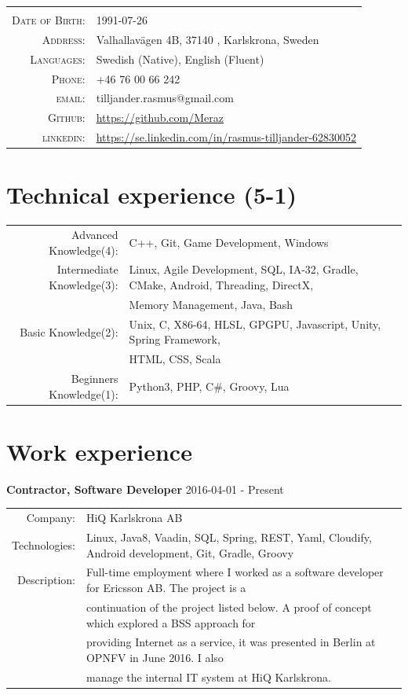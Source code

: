 \documentclass[a4paper,10pt]{article}
\begin{document}
\begin{tabular}{rl}
    \textsc{} &    \\
    \textsc{Date of Birth:} &  1991-07-26   \\
    \textsc{Address:}   & Valhallavägen 4B, 37140 , Karlskrona, Sweden \\
    \textsc{Languages:}  & Swedish (Native), English (Fluent) \\
    \textsc{Phone:}     & +46 76 00 66 242\\
    \textsc{email:}     & tilljander.rasmus@gmail.com\\
    \textsc{Github:}  & \url{https://github.com/Meraz}\\
    \textsc{linkedin:}  & \url{https://se.linkedin.com/in/rasmus-tilljander-62830052}
\end{tabular}
\section{Technical experience (5-1)}
\begin{tabular}{rl}

Advanced Knowledge(4):& C++, Git, Game Development, Windows\\
Intermediate Knowledge(3):& Linux, Agile Development, SQL, IA-32, Gradle, CMake, Android, Threading,  DirectX, \\& Memory Management, Java, Bash\\
Basic Knowledge(2):& Unix, C, X86-64, HLSL, GPGPU, Javascript, Unity, Spring Framework,\\& HTML, CSS, Scala \\
Beginners Knowledge(1):& Python3, PHP, C\#, Groovy, Lua\\
\end{tabular}

\section{Work experience}
\textbf{Contractor, Software Developer} 2016-04-01 - Present \\
\begin{tabular}{rl}
Company:& HiQ Karlskrona AB \\
Technologies:&  Linux, Java8, Vaadin, SQL, Spring, REST, Yaml, Cloudify, Android development, Git, Gradle, Groovy\\
Description:& Full-time employment where I worked as a software developer for Ericsson AB. The project is a\\&
continuation of the project listed below. A proof of concept which explored a BSS approach for\\&
providing Internet as a service, it was presented in Berlin at OPNFV in June 2016. I also\\&
manage the internal IT system at HiQ Karlskrona.
\end{tabular}\\
\end{document}
